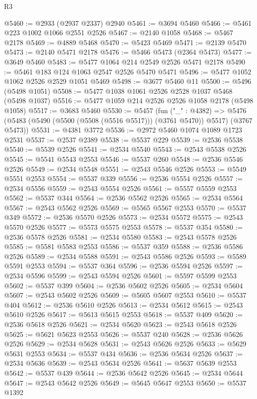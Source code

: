 \begin{lexlean}{R3}
\begin{coremodule}
@5460 := @2933 (@2937 @2337) @2940
@5461 := @3694 @5460
@5466 := @5461 @223 @1002 @1066 @2551 @2526
@5467 := @2140 @1058
@5468 := @5467 @2178
@5469 := @4889 @5468
@5470 := @5423 @5469
@5471 := @2139 @5470
@5473 := @2140 @5471 @2178
@5476 := @5466 @5473 (@2364 @5473)
@5477 := @3649 @5460
@5483 := @5477 @1064 @214 @2549 @2526 @5471 @2178
@5490 := @5461 @183 @124 @1063 @2547 @2526 @5470 @5471
@5496 := @5477 @1052 @1062 @2526 @2529 @1051 @5469
@5498 := @3677 @5460 @11
@5500 := @5496 (@5498 @1051)
@5508 := @5477 @1038 @1061 @2526 @2528 @1037 @5468 (@5498 @1037)
@5516 := @5477 @1059 @214 @2526 @2526 @1058 @2178 (@5498 @1058)
@5517 := @3683 @5460
@5530 := @5457
    (fun ("_" : @4382) =>
    @5476 (@5483 (@5490 (@5500 (@5508 (@5516 @5517))) (@3761 @5470)) @5517) (@3767 @5473))
@5531 := @4381 @3772
@5536 := @2972 @5460 @1074 @1089 @1723 @2531
@5537 := @2537 @2389
@5538 := @5537 @229
@5539 := @2536 @5538
@5540 := @5539 @2526
@5541 := @2534 @5540
@5543 := @2543 @5538 @2526
@5545 := @5541 @5543 @2553
@5546 := @5537 @260
@5548 := @2536 @5546 @2526
@5549 := @2534 @5548
@5551 := @2543 @5546 @2526
@5553 := @5549 @5551 @2553
@5554 := @5537 @339
@5556 := @2536 @5554 @2526
@5557 := @2534 @5556
@5559 := @2543 @5554 @2526
@5561 := @5557 @5559 @2553
@5562 := @5537 @344
@5564 := @2536 @5562 @2526
@5565 := @2534 @5564
@5567 := @2543 @5562 @2526
@5569 := @5565 @5567 @2553
@5570 := @5537 @349
@5572 := @2536 @5570 @2526
@5573 := @2534 @5572
@5575 := @2543 @5570 @2526
@5577 := @5573 @5575 @2553
@5578 := @5537 @354
@5580 := @2536 @5578 @2526
@5581 := @2534 @5580
@5583 := @2543 @5578 @2526
@5585 := @5581 @5583 @2553
@5586 := @5537 @359
@5588 := @2536 @5586 @2526
@5589 := @2534 @5588
@5591 := @2543 @5586 @2526
@5593 := @5589 @5591 @2553
@5594 := @5537 @364
@5596 := @2536 @5594 @2526
@5597 := @2534 @5596
@5599 := @2543 @5594 @2526
@5601 := @5597 @5599 @2553
@5602 := @5537 @399
@5604 := @2536 @5602 @2526
@5605 := @2534 @5604
@5607 := @2543 @5602 @2526
@5609 := @5605 @5607 @2553
@5610 := @5537 @404
@5612 := @2536 @5610 @2526
@5613 := @2534 @5612
@5615 := @2543 @5610 @2526
@5617 := @5613 @5615 @2553
@5618 := @5537 @409
@5620 := @2536 @5618 @2526
@5621 := @2534 @5620
@5623 := @2543 @5618 @2526
@5625 := @5621 @5623 @2553
@5626 := @5537 @240
@5628 := @2536 @5626 @2526
@5629 := @2534 @5628
@5631 := @2543 @5626 @2526
@5633 := @5629 @5631 @2553
@5634 := @5537 @434
@5636 := @2536 @5634 @2526
@5637 := @2534 @5636
@5639 := @2543 @5634 @2526
@5641 := @5637 @5639 @2553
@5642 := @5537 @439
@5644 := @2536 @5642 @2526
@5645 := @2534 @5644
@5647 := @2543 @5642 @2526
@5649 := @5645 @5647 @2553
@5650 := @5537 @1392

\end{coremodule}
\end{lexlean}
